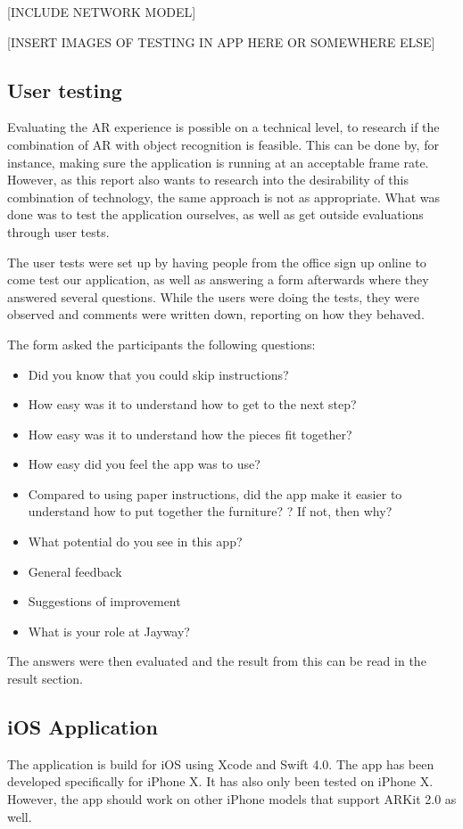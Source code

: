 [INCLUDE NETWORK MODEL]

 [INSERT IMAGES OF TESTING IN APP HERE  OR SOMEWHERE ELSE] 

\subsection{User testing}
Evaluating the AR experience is possible on a technical level, to research if the 
combination of AR with object recognition is feasible. This can be done by, for instance,  
making sure the application is running at an acceptable frame rate. However, as this 
report also wants to research into the desirability of this combination of technology, the 
same approach is not as appropriate. What was done was to test the 
application ourselves, as well as get outside evaluations through user tests.

The user tests were set up by having people from the office sign up online to come test our 
application, as well as answering a form afterwards where they answered several 
questions. While the users were doing the tests, they were observed and comments were 
written down, reporting on how they behaved. 

The form asked the participants the following questions:
\begin{itemize}
\item Did you know that you could skip instructions?
\item How easy was it to understand how to get to the next step?
\item How easy was it to understand how the pieces fit together?
\item How easy did you feel the app was to use?
\item Compared to using paper instructions, did the app make it easier to understand how to put together the furniture? ? If not, then why?
\item What potential do you see in this app?
\item General feedback
\item Suggestions of improvement
\item What is your role at Jayway?
\end{itemize}

The answers were then evaluated and the result from this can be read in the result section.

\subsection{iOS Application}
The application is build for iOS using Xcode and Swift 4.0. The app has been developed specifically for iPhone X. It has also only been tested on iPhone X. However, the app should work on other iPhone models that support ARKit 2.0 as well.

